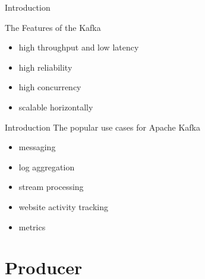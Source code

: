 \begin{frame}[plain,t]{Introduction} %
    \vspace{2ex}
    
    The Features of the Kafka
     \vspace{2ex}
    \begin{itemize}
        \item high throughput and low latency
        \item high reliability
        \item high concurrency
        \item scalable horizontally
    \end{itemize}


    
\end{frame}
\begin{frame}[plain,t]{Introduction} %
    \vspace{2ex}
The popular use cases for Apache Kafka
 \vspace{2ex}
     \begin{itemize}
        \item messaging
        \item log aggregation
        \item stream processing
        \item website activity tracking
        \item metrics
    \end{itemize}
    
    
    
\end{frame}


\section{Producer}


